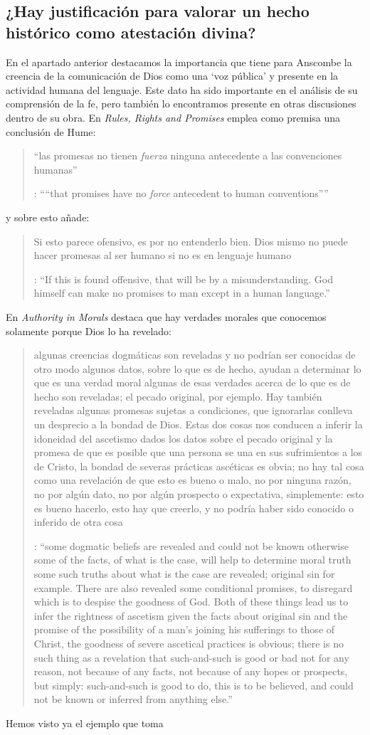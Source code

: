 \subsection{¿Hay justificación para valorar un hecho histórico como atestación divina?}

En el apartado anterior destacamos la importancia que tiene para Anscombe la creencia de la comunicación de Dios como una `voz pública' y presente en la actividad humana del lenguaje. Este dato ha sido importante en el análisis de su comprensión de la fe, pero también lo encontramos presente en otras discusiones dentro de su obra. En \emph{Rules, Rights and Promises} emplea como premisa una conclusión de Hume: \blockquote[{\cite[99]{anscombe1981erp:rrp}}: \enquote{``that promises have no \emph{force} antecedent to human conventions''}]{``las promesas no tienen \emph{fuerza} ninguna antecedente a las convenciones humanas''} y sobre esto añade: \blockquote[{\cite[99]{anscombe1981erp:rrp}}: \enquote{If this is found offensive, that will be by a misunderstanding. God himself can make no promises to man except in a human language.}]{Si esto parece ofensivo, es por no entenderlo bien. Dios mismo no puede hacer promesas al ser humano si no es en lenguaje humano}. En \emph{Authority in Morals} destaca que hay verdades morales que conocemos solamente porque Dios lo ha revelado: \blockquote[{\cite[48-49]{anscombe1981erp:am}}: \enquote{some dogmatic beliefs are revealed and could not be known otherwise \textelp{} some of the facts, of what is the case, will help to determine moral truth \textelp{} some such truths about what is the case are revealed; original sin for example. There are also revealed some conditional promises, to disregard which is to despise the goodness of God. Both of these things lead us to infer the rightness of ascetism \textelp{} given the facts about original sin and the promise of the possibility of a man's joining his sufferings to those of Christ, the goodness of severe ascetical practices \textelp{} is obvious; there is no such thing as a revelation that such-and-such is good or bad not for any reason, not because of any facts, not because of any hopes or prospects, but simply: such-and-such is good to do, this is to be believed, and could not be known or inferred from anything else.}]{algunas creencias dogmáticas son reveladas y no podrían ser conocidas de otro modo \textelp{} algunos datos, sobre lo que es de hecho, ayudan a determinar lo que es una verdad moral \textelp{} algunas de esas verdades acerca de lo que es de hecho son reveladas; el pecado original, por ejemplo. Hay también reveladas algunas promesas sujetas a condiciones, que ignorarlas conlleva un desprecio a la bondad de Dios. Estas dos cosas nos conducen a inferir la idoneidad del ascetismo \textelp{} dados los datos sobre el pecado original y la promesa de que es posible que una persona se una en sus sufrimientos a los de Cristo, la bondad de severas prácticas ascéticas \textelp{} es obvia; no hay tal cosa como una revelación de que esto es bueno o malo, no por ninguna razón, no por algún dato, no por algún prospecto o expectativa, simplemente: esto es bueno hacerlo, esto hay que creerlo, y no podría haber sido conocido o inferido de otra cosa}. Hemos visto ya el ejemplo que toma 